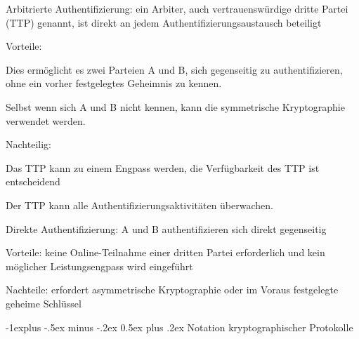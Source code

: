 \documentclass[a4paper]{article}
\makeatletter
\renewcommand{\subsection}{\@startsection{subsection}{2}{0mm}%
 {-1explus -.5ex minus -.2ex}%
 {0.5ex plus .2ex}%
 {\normalfont\normalsize\bfseries}}
\makeatother
\begin{document}
\begin{multicols}{3}
\begin{itemize*}
            \begin{itemize*}
                  \item Arbitrierte Authentifizierung: ein Arbiter, auch vertrauenswürdige dritte Partei (TTP) genannt, ist direkt an jedem Authentifizierungsaustausch beteiligt
                  \begin{itemize*} \item Vorteile:
                        \begin{itemize*} \item Dies ermöglicht es zwei Parteien A und B, sich gegenseitig zu authentifizieren, ohne ein vorher festgelegtes Geheimnis zu kennen. \item Selbst wenn sich A und B nicht kennen, kann die symmetrische Kryptographie verwendet werden. \end{itemize*} \item Nachteilig:
                        \begin{itemize*} \item Das TTP kann zu einem Engpass werden, die Verfügbarkeit des TTP ist entscheidend \item Der TTP kann alle Authentifizierungsaktivitäten überwachen. \end{itemize*} \end{itemize*}
                  \item Direkte Authentifizierung: A und B authentifizieren sich direkt gegenseitig
                  \begin{itemize*} \item Vorteile: keine Online-Teilnahme einer dritten Partei erforderlich und kein möglicher Leistungsengpass wird eingeführt \item Nachteile: erfordert asymmetrische Kryptographie oder im Voraus festgelegte geheime Schlüssel \end{itemize*}
            \end{itemize*}
      \end{itemize*}


      \subsection{Notation kryptographischer
            Protokolle}


\end{multicols}
\end{document}
